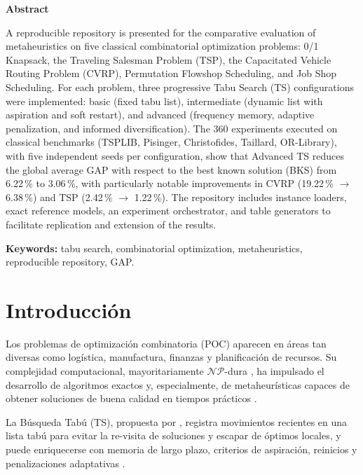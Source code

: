 \documentclass[12pt]{article}
\newcommand{\NP}{\ensuremath{\mathcal{NP}}}
\begin{document}
\vspace{0.25cm}
\begin{center}\textbf{Abstract}\end{center}
\vspace{-0.15cm}
{\footnotesize{}
\noindent
A reproducible repository is presented for the comparative evaluation of
metaheuristics on five classical combinatorial optimization problems: 0/1
Knapsack, the Traveling Salesman Problem (TSP), the Capacitated Vehicle
Routing Problem (CVRP), Permutation Flowshop Scheduling, and Job Shop
Scheduling. For each problem, three progressive Tabu Search (TS)
configurations were implemented: basic (fixed tabu list), intermediate
(dynamic list with aspiration and soft restart), and advanced (frequency
memory, adaptive penalization, and informed diversification). The 360
experiments executed on classical benchmarks (TSPLIB, Pisinger,
Christofides, Taillard, OR-Library), with five independent seeds per
configuration, show that Advanced TS reduces the global average GAP with
respect to the best known solution (BKS) from 6.22\,\% to 3.06\,\%, with
particularly notable improvements in CVRP (19.22\,\% $\rightarrow$
6.38\,\%) and TSP (2.42\,\% $\rightarrow$ 1.22\,\%). The repository
includes instance loaders, exact reference models, an experiment
orchestrator, and table generators to facilitate replication and extension
of the results.

\vspace{0.1cm}
\noindent
\textbf{Keywords:} tabu search, combinatorial optimization, metaheuristics,
reproducible repository, GAP.
}

\twocolumn

\section{Introducción}

Los problemas de optimización combinatoria (POC) aparecen en áreas tan
diversas como logística, manufactura, finanzas y planificación de recursos.
Su complejidad computacional, mayoritariamente \NP-dura
\citep{garey1979computers}, ha impulsado el desarrollo de algoritmos
exactos y, especialmente, de metaheurísticas capaces de obtener soluciones
de buena calidad en tiempos prácticos \citep{gendreau2010handbook}.

La Búsqueda Tabú (TS), propuesta por \citet{glover1986future,glover1989tabu},
registra movimientos recientes en una lista tabú para evitar la re-visita de
soluciones y escapar de óptimos locales, y puede enriquecerse con memoria
de largo plazo, criterios de aspiración, reinicios y penalizaciones
adaptativas \citep{glover1997tabu}.
\end{document}
